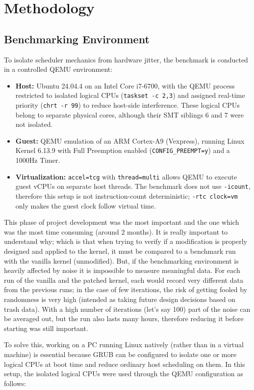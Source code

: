 \documentclass[11pt, a4paper]{article}
\begin{document}
\section{Methodology}

\subsection{Benchmarking Environment}
To isolate scheduler mechanics from hardware jitter, the benchmark is conducted in a controlled QEMU environment:
\begin{itemize}
    \item \textbf{Host:} Ubuntu 24.04.4 on an Intel Core i7-6700, with the QEMU process restricted to isolated logical CPUs (\texttt{taskset -c 2,3}) and assigned real-time priority (\texttt{chrt -r 99}) to reduce host-side interference. These logical CPUs belong to separate physical cores, although their SMT siblings 6 and 7 were not isolated.
    \item \textbf{Guest:} QEMU emulation of an ARM Cortex-A9 (Vexpress), running Linux Kernel 6.13.9 with Full Preemption enabled (\texttt{CONFIG\_PREEMPT=y}) and a 1000Hz Timer.
    \item \textbf{Virtualization:} \texttt{accel=tcg} with \texttt{thread=multi} allows QEMU to execute guest vCPUs on separate host threads. The benchmark does not use \texttt{-icount}, therefore this setup is not instruction-count deterministic; \texttt{-rtc clock=vm} only makes the guest clock follow virtual time.
\end{itemize}
This phase of project development was the most important and the one which was the most time consuming (around 2 months).
It is really important to understand why; which is that when trying to verify if a modification is properly designed and applied to the kernel, 
it must be compared to a benchmark run with the vanilla kernel (unmodified).
But, if the benchmarking environment is heavily affected by noise it is impossible to measure meaningful data. For each run of the vanilla and
the patched kernel, each would record very different data from the previous runs; in the case of few iterations, the risk of getting fooled by randomness is very high (intended as taking future design decisions based on trash data).
With a high number of iterations (let's say 100) part of the noise can be averaged out, but the run also lasts many hours, therefore reducing it before starting was still important.

To solve this, working on a PC running Linux natively (rather than in a virtual machine) is essential because GRUB can be configured to isolate one or more logical CPUs at boot time
and reduce ordinary host scheduling on them. In this setup, the isolated logical CPUs were used through the QEMU configuration as follows:
\end{document}
